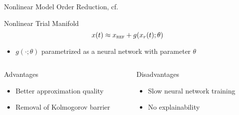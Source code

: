 \begin{frame}{Nonlinear Model Order Reduction, cf.~\cite{Lee2020}}
    \begin{block}{Nonlinear Trial Manifold}
        \begin{equation*}
            x(t) \approx x_{\textsc{ref}} + g(x_r(t); \theta)
        \end{equation*}
    \end{block}
    \begin{itemize}
        \item $g(\cdot; \theta)$ parametrized as a neural network with parameter $\theta$
    \end{itemize}

    {
        \begin{columns}
            \begin{column}{.5\textwidth}
                \begin{block}{Advantages}
                    \begin{itemize}
                        \item Better approximation quality
                        \item Removal of Kolmogorov barrier
                    \end{itemize}
                \end{block}
            \end{column}
            \begin{column}{.42\textwidth}
                \begin{block}{Disadvantages}
                    \begin{itemize}
                        \item Slow neural network training
                        \item No explainability
                    \end{itemize}
            \end{block}
            \end{column}
        \end{columns}
    }
\end{frame}

